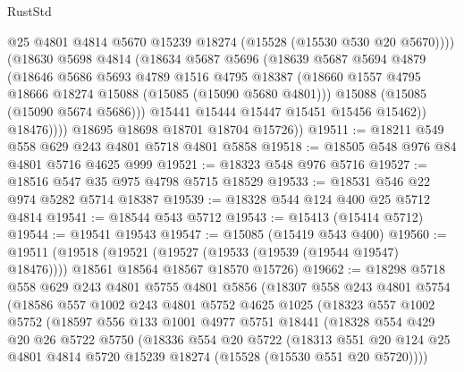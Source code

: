 \begin{lexlean}{RustStd}
\begin{coremodule}
                  @25
                  @4801
                  @4814
                  @5670
                  @15239
                  @18274
                  (@15528 (@15530 @530 @20 @5670))))
              (@18630
                @5698
                @4814
                (@18634
                  @5687
                  @5696
                  (@18639
                    @5687
                    @5694
                    @4879
                    (@18646
                      @5686
                      @5693
                      @4789
                      @1516
                      @4795
                      @18387
                      (@18660 @1557 @4795 @18666 @18274 @15088 (@15085 (@15090 @5680 @4801)))
                      @15088
                      (@15085 (@15090 @5674 @5686)))
                    @15441
                    @15444
                    @15447
                    @15451
                    @15456
                    @15462))
                @18476))))
        @18695
        @18698
        @18701
        @18704
        @15726))
@19511 := @18211 @549 @558 @629 @243 @4801 @5718 @4801 @5858
@19518 := @18505 @548 @976 @84 @4801 @5716 @4625 @999
@19521 := @18323 @548 @976 @5716
@19527 := @18516 @547 @35 @975 @4798 @5715 @18529
@19533 := @18531 @546 @22 @974 @5282 @5714 @18387
@19539 := @18328 @544 @124 @400 @25 @5712 @4814
@19541 := @18544 @543 @5712
@19543 := @15413 (@15414 @5712)
@19544 := @19541 @19543
@19547 := @15085 (@15419 @543 @400)
@19560 := @19511
    (@19518
      (@19521 (@19527 (@19533 (@19539 (@19544 @19547) @18476))))
      @18561
      @18564
      @18567
      @18570
      @15726)
@19662 := @18298
    @5718
    @558
    @629
    @243
    @4801
    @5755
    @4801
    @5856
    (@18307
      @558
      @243
      @4801
      @5754
      (@18586
        @557
        @1002
        @243
        @4801
        @5752
        @4625
        @1025
        (@18323
          @557
          @1002
          @5752
          (@18597
            @556
            @133
            @1001
            @4977
            @5751
            @18441
            (@18328
              @554
              @429
              @20
              @26
              @5722
              @5750
              (@18336
                @554
                @20
                @5722
                (@18313
                  @551
                  @20
                  @124
                  @25
                  @4801
                  @4814
                  @5720
                  @15239
                  @18274
                  (@15528 (@15530 @551 @20 @5720))))

\end{coremodule}
\end{lexlean}

